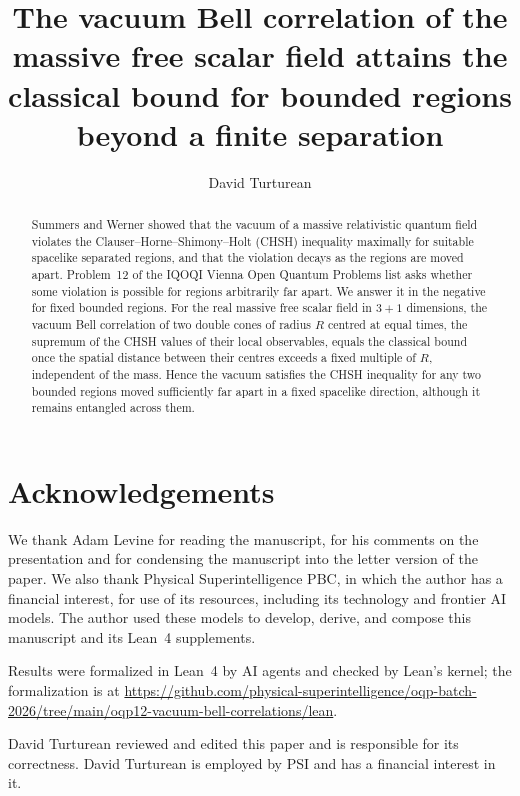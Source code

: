 \documentclass[11pt]{amsart}
\title[Vacuum Bell correlation beyond a finite separation]
{The vacuum Bell correlation of the massive free scalar field
attains the classical bound for bounded regions beyond a finite separation}
\author{David Turturean}\thanks{D.T. built and ran the automated research and formalization workflows at PSI that produced these results, steered the writing of the manuscript, and asked for AI reviews and revisions of the drafts.}
\date{}
\numberwithin{equation}{section}
\theoremstyle{definition}
\begin{document}
\begin{abstract}
Summers and Werner showed that the vacuum of a massive relativistic quantum field violates the Clauser--Horne--Shimony--Holt (CHSH) inequality maximally for suitable spacelike separated regions, and that the violation decays as the regions are moved apart. Problem~12 of the IQOQI Vienna Open Quantum Problems list asks whether some violation is possible for regions arbitrarily far apart. We answer it in the negative for fixed bounded regions. For the real massive free scalar field in $3+1$ dimensions, the vacuum Bell correlation of two double cones of radius $R$ centred at equal times, the supremum of the CHSH values of their local observables, equals the classical bound once the spatial distance between their centres exceeds a fixed multiple of $R$, independent of the mass. Hence the vacuum satisfies the CHSH inequality for any two bounded regions moved sufficiently far apart in a fixed spacelike direction, although it remains entangled across them.
\end{abstract}

\maketitle

\clearpage
\vspace*{\fill}
\section*{Acknowledgements}

We thank Adam Levine for reading the manuscript, for his comments on the presentation and for condensing the manuscript into the letter version of the paper. We also thank Physical Superintelligence PBC, in which the author has a financial interest, for use of its resources, including its technology and frontier AI models. The author used these models to develop, derive, and compose this manuscript and its Lean~4 supplements.

Results were formalized in Lean~4 by AI agents and checked by Lean's kernel; the formalization is at \url{https://github.com/physical-superintelligence/oqp-batch-2026/tree/main/oqp12-vacuum-bell-correlations/lean}.

David Turturean reviewed and edited this paper and is responsible for its correctness. David Turturean is employed by PSI and has a financial interest in it.

\vspace*{\fill}
\newpage
\end{document}
